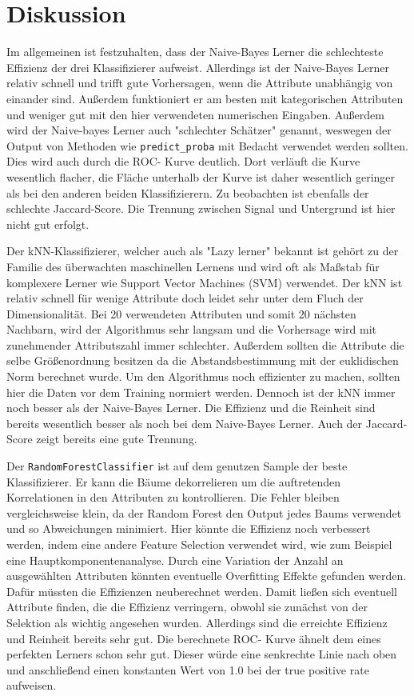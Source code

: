 \section{Diskussion}
\label{sec:discussion}

Im allgemeinen ist festzuhalten, dass der Naive-Bayes Lerner die schlechteste Effizienz der drei Klassifizierer aufweist.
Allerdings ist der Naive-Bayes Lerner relativ schnell und trifft gute Vorhersagen, wenn die Attribute unabh\"angig von einander sind. Au\ss erdem funktioniert er am besten mit kategorischen Attributen und weniger gut mit den hier verwendeten numerischen Eingaben.
Au\ss erdem wird der Naive-bayes Lerner auch "schlechter Sch\"atzer" genannt, weswegen der Output von Methoden wie \texttt{predict\_proba} mit Bedacht verwendet werden sollten.
Dies wird auch durch die ROC- Kurve deutlich.
Dort verläuft die Kurve wesentlich flacher, die Fläche unterhalb der Kurve ist daher wesentlich geringer als bei den anderen beiden Klassifizierern.
Zu beobachten ist ebenfalls der schlechte Jaccard-Score.
Die Trennung zwischen Signal und Untergrund ist hier nicht gut erfolgt.

Der kNN-Klassifizierer, welcher auch als "Lazy lerner" bekannt ist geh\"ort zu der Familie des \"uberwachten maschinellen Lernens und wird oft als Maßstab f\"ur komplexere Lerner wie Support Vector Machines (SVM) verwendet.
Der kNN ist relativ schnell f\"ur wenige Attribute doch leidet sehr unter dem Fluch der Dimensionalit\"at. Bei 20 verwendeten Attributen und somit 20 n\"achsten Nachbarn, wird der Algorithmus sehr langsam und die Vorhersage wird mit zunehmender Attributszahl immer schlechter.
Au\ss erdem sollten die Attribute die selbe Gr\"o\ss enordnung besitzen da die Abstandsbestimmung mit der euklidischen Norm berechnet wurde. Um den Algorithmus noch effizienter zu machen, sollten hier die Daten vor dem Training normiert werden.
Dennoch ist der kNN immer noch besser als der Naive-Bayes Lerner.
Die Effizienz und die Reinheit sind bereits wesentlich besser als noch bei dem Naive-Bayes Lerner.
Auch der Jaccard-Score zeigt bereits eine gute Trennung.

Der \texttt{RandomForestClassifier} ist auf dem genutzen Sample der beste Klassifizierer. Er kann die B\"aume dekorrelieren um die auftretenden Korrelationen in den Attributen zu kontrollieren.
Die Fehler bleiben vergleichsweise klein, da der Random Forest den Output jedes Baums verwendet und so Abweichungen minimiert.
Hier k\"onnte die Effizienz noch verbessert werden, indem eine andere Feature Selection verwendet wird, wie zum Beispiel eine Hauptkomponentenanalyse.
Durch eine Variation der Anzahl an ausgewählten Attributen könnten eventuelle Overfitting Effekte gefunden werden.
Dafür müssten die Effizienzen neuberechnet werden.
Damit ließen sich eventuell Attribute finden, die die Effizienz verringern, obwohl sie zunächst von der Selektion als wichtig angesehen wurden.
Allerdings sind die erreichte Effizienz und Reinheit bereits sehr gut.
Die berechnete ROC- Kurve ähnelt dem eines perfekten Lerners schon sehr gut.
Dieser würde eine senkrechte Linie nach oben und anschließend einen konstanten Wert von 1.0 bei der true positive rate aufweisen.

